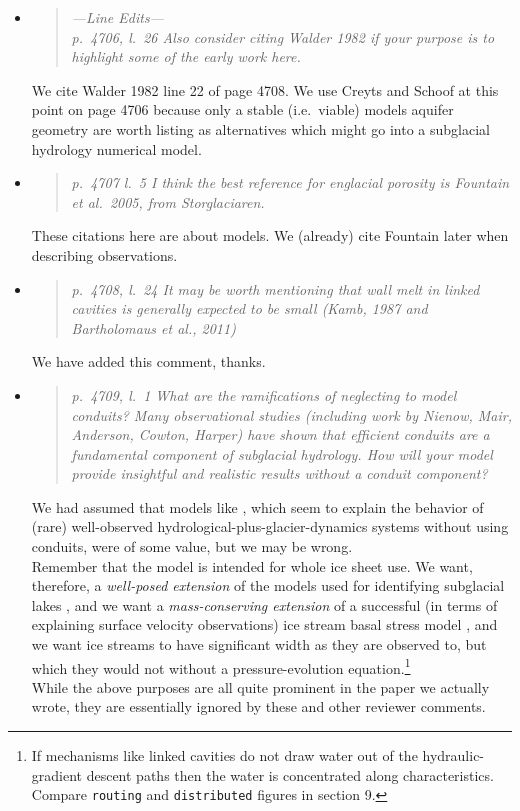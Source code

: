 \documentclass[11pt,reqno]{amsart}
\newcommand{\reply}[2]{
\medskip\medskip
\item  \begin{quote}
\emph{#1}
\end{quote}

\medskip
\noindent #2}
\begin{document}
\begin{itemize}
\reply{---Line Edits---\\
p.~4706, l.~26 Also consider citing Walder 1982 if your purpose is to highlight some of
the early work here.}
{We cite Walder 1982 line 22 of page 4708.  We use Creyts and Schoof at this point on page 4706 because only a stable (i.e.~viable) models aquifer geometry are worth listing as alternatives which might go into a subglacial hydrology numerical model.}

\reply{p.~4707 l.~5 I think the best reference for englacial porosity is Fountain et al.~2005, from Storglaciaren.}
{These citations here are about models.  We (already) cite Fountain later when describing observations.}

\reply{p.~4708, l.~24 It may be worth mentioning that wall melt in linked cavities is generally
expected to be small (Kamb, 1987 and Bartholomaus et al., 2011)}
{We have added this comment, thanks.}

\reply{p.~4709, l.~1 What are the ramifications of neglecting to model conduits? Many observational studies (including work by Nienow, Mair, Anderson, Cowton, Harper) have
shown that efficient conduits are a fundamental component of subglacial hydrology.
How will your model provide insightful and realistic results without a conduit component?}
{We had assumed that models like \cite{Bartholomausetal2011}, which seem to explain the behavior of (rare) well-observed hydrological-plus-glacier-dynamics systems without using conduits, were of some value, but we may be wrong.\\
\indent Remember that the model is intended for whole ice sheet use.  We want, therefore, a \emph{well-posed extension} of the models used for identifying subglacial lakes \cite{LeBrocqetal2009,Siegertetal2009}, and we want a \emph{mass-conserving extension} of a successful (in terms of explaining surface velocity observations) ice stream basal stress model \cite{AschwandenAdalgeirsdottirKhroulev,BBssasliding,Tulaczyketal2000}, and we want ice streams to have significant width as they are observed to, but which they would not without a pressure-evolution equation.\footnote{If mechanisms like linked cavities do not draw water out of the hydraulic-gradient descent paths then the water is concentrated along characteristics.  Compare \texttt{routing} and \texttt{distributed} figures in section 9.}\\
\indent While the above purposes are all quite prominent in the paper we actually wrote, they are essentially ignored by these and other reviewer comments.}


\end{itemize}
\end{document}
